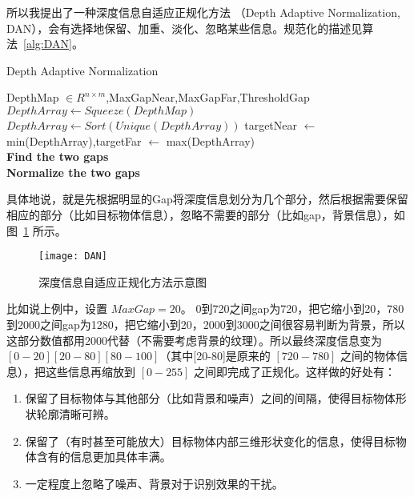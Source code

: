 所以我提出了一种{\heiti 深度信息自适应正规化方法} （Depth Adaptive Normalization, DAN），会有选择地保留、加重、淡化、忽略某些信息。规范化的描述见算法~\ref{alg:DAN}。

\begin{algorithm}
  \caption{Depth Adaptive Normalization}
  \label{alg:DAN}
  \begin{algorithmic}[1]
    \REQUIRE DepthMap $\in R^{n \times m}$,\quad MaxGapNear,\quad MaxGapFar,\quad ThresholdGap
    \STATE $DepthArray \gets Squeeze(DepthMap)$
    \STATE $DepthArray \gets Sort(Unique(DepthArray))$
    \STATE targetNear $\gets$ min(DepthArray),\quad targetFar $\gets$ max(DepthArray)
    \\ \textbf{Find the two gaps}
        \ELSE
        \ENDIF
      \ENDIF
    \ENDFOR
    \\ \textbf{Normalize the two gaps}
      \ELSE
      \ENDIF
    \ENDFOR
  \end{algorithmic}
\end{algorithm}

具体地说，就是先根据明显的Gap将深度信息划分为几个部分，然后根据需要保留相应的部分（比如目标物体信息），忽略不需要的部分（比如gap，背景信息），如图~\ref{fig:DAN} 所示。

\begin{figure}[H] %
  \centering
  \texttt{[image: DAN]}
  \caption{深度信息自适应正规化方法示意图}
  \label{fig:DAN}
\end{figure}

比如说上例中，设置 $MaxGap = 20$。 0到720之间gap为720，把它缩小到20，780到2000之间gap为1280，把它缩小到20，2000到3000之间很容易判断为背景，所以这部分数值都用2000代替（不需要考虑背景的纹理）。所以最终深度信息变为$[0-20][20-80][80-100]$（其中[20-80]是原来的 $[720-780]$ 之间的物体信息），把这些信息再缩放到 $[0-255]$ 之间即完成了正规化。这样做的好处有：

\begin{enumerate}
\item 保留了目标物体与其他部分（比如背景和噪声）之间的间隔，使得目标物体形状轮廓清晰可辨。
\item 保留了（有时甚至可能放大）目标物体内部三维形状变化的信息，使得目标物体含有的信息更加具体丰满。
\item 一定程度上忽略了噪声、背景对于识别效果的干扰。
\end{enumerate}


